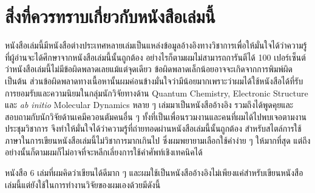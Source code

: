 

{

\chapter*{\centering สิ่งที่ควรทราบเกี่ยวกับหนังสือเล่มนี้}

หนังสือเล่มนี้มีหนังสือต่างประเทศหลายเล่มเป็นแหล่งข้อมูลอ้างอิงทางวิชาการเพื่อให้มั่นใจได้ว่าความรู้ที่ผู้อ่านจะได้ศึกษาจากหนังสือเล่มนี้นั้นถูกต้อง อย่างไรก็ตามผมไม่สามารถการันตีได้ 100 เปอร์เซ็นต์ว่าหนังสือเล่มนี้ไม่มีข้อผิดพลาดเลยแม้แต่จุดเดียว ข้อผิดพลาดเล็กน้อยอาจจะเกิดจากการพิมพ์ผิด เป็นต้น ส่วนข้อผิดพลาดทางเนื้อหานั้นผมค่อนข้างมั่นใจว่ามีน้อยมากเพราะว่าผมได้ใช้หนังสือได้ที่รับการยอมรับและความนิยมในกลุ่มนักวิจัยทางด้าน Quantum Chemistry, Electronic Structure และ \textit{ab initio} Molecular Dynamics หลาย ๆ เล่มมาเป็นหนังสืออ้างอิง รวมถึงได้พูดคุยและสอบถามกับนักวิจัยด้านเคมีควอนตัมคนอื่น ๆ ทั้งที่เป็นเพื่อนรวมงานและคนที่ผมได้ไปพบเจอตามงานประชุมวิชาการ จึงทำให้มั่นใจได้ว่าความรู้ที่ถ่ายทอดผ่านหนังสือเล่มนี้นั้นถูกต้อง สำหรับสไตล์การใช้ภาษาในการเขียนหนังสือเล่มนี้ไม่วิชาการมากเกินไป ซึ่งผมพยายามเลือกใช้คำง่าย ๆ ให้มากที่สุด แต่ถึงอย่างนั้นก็ตามผมก็ไม่อาจที่จะหลีกเลี่ยงการใช้คำศัพท์เชิงเทคนิคได้

หนังสือ 6 เล่มที่ผมคิดว่าเขียนได้ดีมาก ๆ และผมใช้เป็นหนังสืออ้างอิงไม่เพียงแค่สำหรับเขียนหนังสือเล่มนี้แต่ยังใช้ในการทำงานวิจัยของผมเองด้วยมีดังนี้

}
